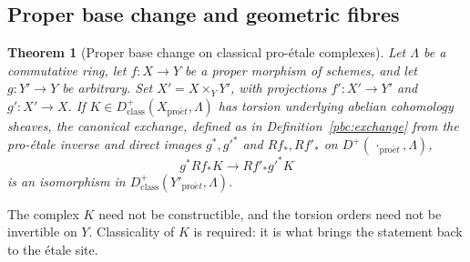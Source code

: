 \documentclass[11pt,a4paper]{article}
\numberwithin{equation}{section}
\newtheorem{theorem}{Theorem}[section]
\theoremstyle{definition}
\theoremstyle{remark}
\newcommand{\proet}{\mathrm{pro}\acute{e}t}
\begin{document}
\subsection{Proper base change and geometric fibres}
\label{pbc:sec-torsion-theorem}

\begin{theorem}[Proper base change on classical pro-\'etale complexes]
\label{pbc:torsion-theorem}
Let $\Lambda$ be a commutative ring, let $f:X\to Y$ be a proper
morphism of schemes, and let $g:Y'\to Y$ be arbitrary. Set
$X'=X\times_YY'$, with projections $f':X'\to Y'$ and $g':X'\to X$.
If $K\in D^+_{\mathrm{class}}(X_{\proet},\Lambda)$ has torsion
underlying abelian cohomology sheaves, the canonical exchange,
defined as in Definition~\ref{pbc:exchange} from the pro-\'etale
inverse and direct images $g^*,g'^*$ and $Rf_*,Rf'_*$ on
$D^+(\,\cdot_{\proet},\Lambda)$,
\[
 g^*Rf_*K\longrightarrow Rf'_*g'^*K
\]
is an isomorphism in $D^+_{\mathrm{class}}(Y'_{\proet},\Lambda)$.
\end{theorem}

The complex $K$ need not be constructible, and the torsion orders need
not be invertible on $Y$. Classicality of $K$ is required: it is what
brings the statement back to the \'etale site.
\end{document}
